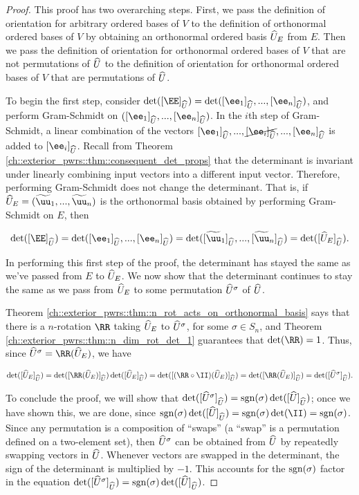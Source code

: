 \begin{proof}
   This proof has two overarching steps. First, we pass the definition of orientation for arbitrary ordered bases of $V$ to the definition of orthonormal ordered bases of $V$ by obtaining an orthonormal ordered basis $\widehat{U}_E$ from $E$. Then we pass the definition of orientation for orthonormal ordered bases of $V$ that are not permutations of $\widehat{U}$ to the definition of orientation for orthonormal ordered bases of $V$ that are permutations of $\widehat{U}$.
   
   To begin the first step, consider $\det([\EE]_{\hU}) = \det([\ee_1]_{\hU}, ..., [\ee_n]_{\hU})$, and perform Gram-Schmidt on $([\ee_1]_{\hU}, ..., [\ee_n]_{\hU})$. In the $i$th step of Gram-Schmidt, a linear combination of the vectors $[\ee_1]_{\hU}, ..., \cancel{[\ee_i]_{\hU}}, ..., [\ee_n]_{\hU}$ is added to $[\ee_i]_{\hU}$. Recall from Theorem \ref{ch::exterior_pwrs::thm::consequent_det_props} that the determinant is invariant under linearly combining input vectors into a different input vector. Therefore, performing Gram-Schmidt does not change the determinant. That is, if $\hU_E = (\tuu_1, ..., \tuu_n)$ is the orthonormal basis obtained by performing Gram-Schmidt on $E$, then 
   
   \begin{align*}
       \det([\EE]_{\hU}) = \det([\ee_1]_{\hU}, ..., [\ee_n]_{\hU}) = \det([\tuu_1]_{\hU}, ..., [\tuu_n]_{\hU})
       =
       \det([\hU_E]_{\hU}).
   \end{align*}
   
   In performing this first step of the proof, the determinant has stayed the same as we've passed from $E$ to $\widehat{U}_E$. We now show that the determinant continues to stay the same as we pass from  $\widehat{U}_E$ to some permutation $\widehat{U}^\sigma$ of $\widehat{U}$.
   
   Theorem \ref{ch::exterior_pwrs::thm::n_rot_acts_on_orthonormal_basis} says that there is a $n$-rotation $\RR$ taking $\widehat{U}_E$ to $\widehat{U}^\sigma$, for some $\sigma \in S_n$, and Theorem \ref{ch::exterior_pwrs::thm::n_dim_rot_det_1} guarantees that $\det(\RR) = 1$. Thus, since $\hU^\sigma = \RR(\hU_E)$, we have
   
   \begin{align*}
        \det([\hU_E]_{\hU}) 
        = \det([\RR(\hU_E)]_{\hU}) \det([\hU_E]_{\hU})
        = \det([(\RR \circ \II)(\hU_E)]_{\hU})
        = \det([\RR(\hU_E)]_{\hU})
        = \det([\hU^\sigma]_{\hU}).
   \end{align*}
   
   To conclude the proof, we will show that $\det([\widehat{U}^\sigma]_{\widehat{U}}) = \text{sgn}(\sigma) \det([\widehat{U}]_{\widehat{U}})$; once we have shown this, we are done, since $\sgn(\sigma) \det([\hU]_{\hU}) = \sgn(\sigma) \det(\II) = \sgn(\sigma)$. Since any permutation is a composition of ``swaps'' (a ``swap'' is a permutation defined on a two-element set), then $\widehat{U}^\sigma$ can be obtained from $\widehat{U}$ by repeatedly swapping vectors in $\widehat{U}$. Whenever vectors are swapped in the determinant, the sign of the determinant is multiplied by $-1$. This accounts for the $\text{sgn}(\sigma)$ factor in the equation $\det([\widehat{U}^\sigma]_{\widehat{U}}) = \text{sgn}(\sigma) \det([\widehat{U}]_{\widehat{U}})$.
\end{proof}

